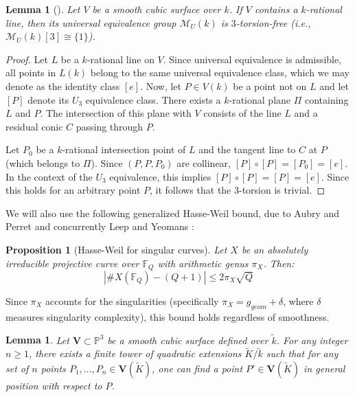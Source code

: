 \documentclass[11pt]{article}
\newtheorem{lemma}[theorem]{Lemma}
\newtheorem{proposition}[theorem]{Proposition}
\theoremstyle{definition}
\newcommand{\FF}{\mathbb{F}}
\newcommand{\PP}{\mathbb{P}}
\newcommand{\kfield}{\tilde{k}}
\newcommand{\Kfield}{\tilde{K}}
\newcommand{\V}{\mathbf{V}}
\begin{document}
\begin{lemma}[{\cite[Prop.~13.7]{manin3}}]
\label{thm:line-implies-3-torsion-free}
Let $V$ be a smooth cubic surface over $k$. If $V$ contains a $k$-rational line, then its universal equivalence group $\mathcal{M}_U(k)$ is $3$-torsion-free (i.e., $\mathcal{M}_U(k)[3] \cong \{1\}$).
\end{lemma}
\begin{proof}
Let $L$ be a $k$-rational line on $V$. Since universal equivalence is admissible, all points in $L(k)$ belong to the same universal equivalence class, which we may denote as the identity class $[e]$. Now, let $P \in V(k)$ be a point not on $L$ and let $[P]$ denote its $U_3$ equivalence class. There exists a $k$-rational plane $\Pi$ containing $L$ and $P$. The intersection of this plane with $V$ consists of the line $L$ and a residual conic $C$ passing through $P$. 

Let $P_0$ be a $k$-rational intersection point of $L$ and the tangent line to $C$ at $P$ (which belongs to $\Pi$).
Since $(P, P, P_0)$ are collinear, $[P] \circ [P] = [P_0] = [e]$.  In the context of the $U_3$ equivalence, this implies $[P] \circ [P] = [P] = [e]$. Since this holds for an arbitrary point $P$, it follows that the 3-torsion is trivial.
\end{proof}

We will also use the following generalized Hasse-Weil bound, due to Aubry and Perret \cite{aubry1996weil} and concurrently Leep and Yeomans \cite{leep1994number}:

\begin{proposition}[Hasse-Weil for singular curves]
\label{thm:aubry-perret}
Let $X$ be an absolutely irreducible projective curve over $\FF_Q$ with arithmetic genus $\pi_X$. Then:
\[ | \#X(\FF_Q) - (Q+1) | \le 2\pi_X \sqrt{Q} \]
\end{proposition}

Since $\pi_X$ accounts for the singularities (specifically $\pi_X = g_{geom} + \delta$, where $\delta$ measures singularity complexity), this bound holds regardless of smoothness.

\begin{lemma}
\label{thm:genposall}
Let $\V \subset \PP^3$ be a smooth cubic surface defined over $\kfield$. For any integer $n \ge 1$, there exists a finite tower of quadratic extensions $\Kfield/\kfield$ such that for any set of $n$ points $P_1, \dotsc, P_n \in \V(\Kfield)$, one can find a point $P' \in \V(\Kfield)$ in general position with respect to $P$.
\end{lemma}
\end{document}
